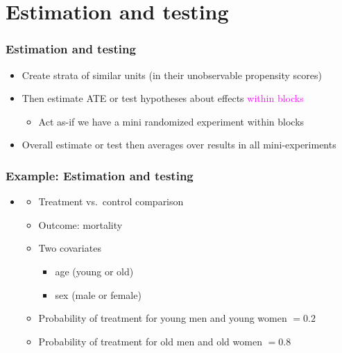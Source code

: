 \documentclass[table, xcolor = {dvipsnames}, 9pt]{beamer}
\theoremstyle{plain}
\begin{document}
\section{Estimation and testing}
\begin{frame}[t]
\frametitle{Estimation and testing}
\vfill
\begin{itemize} \vfill
\item Create strata of similar units (in their unobservable propensity scores) \vfill
\item Then estimate ATE or test hypotheses about effects \textcolor{magenta}{within blocks}
\begin{itemize} \vfill
\item Act as-if we have a mini randomized experiment within blocks \vfill
\end{itemize} \vfill
\item Overall estimate or test then averages over results in all mini-experiments \vfill
\end{itemize}
\vfill 
\end{frame}
\begin{frame}[t]
\frametitle{Example: Estimation and testing}
\vfill
\begin{itemize} \vfill
\item \citet[][p.~66-70]{rosenbaum2017} \vfill
\begin{itemize} \vfill
\item Treatment vs.~control comparison \vfill
\item Outcome: mortality \vfill
\item Two covariates \vfill
\begin{itemize} \vfill
\item age (young or old) \vfill
\item sex (male or female) \vfill
\end{itemize} \vfill
\item Probability of treatment for young men and young women $= 0.2$ \vfill
\item Probability of treatment for old men and old women $= 0.8$ \vfill
\end{itemize} \vfill
\end{itemize}  
\vfill 
\end{frame}
\end{document}
